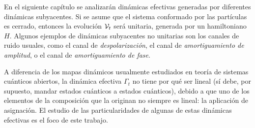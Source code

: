 En el siguiente capítulo se analizarán dinámicas efectivas generadas por diferentes dinámicas subyacentes. Si se asume que el sistema conformado por las partículas es cerrado, entonces la evolución $\mathcal{V}_{t}$ será unitaria, generada por un hamiltoniano $H$. Algunos ejemplos de dinámicas subyacentes no unitarias son los canales de ruido usuales, como el canal de \textit{despolarización}, el canal de \textit{amortiguamiento de amplitud}, o el canal de \textit{amortiguamiento de fase}. 



A diferencia de los mapas dinámicos usualmente estudiados en teoría de sistemas cuánticos abiertos, la dinámica efectiva $\Gamma_{t}$ no tiene por qué ser lineal (sí debe, por supuesto, mandar estados cuánticos a estados cuánticos), debido a que uno de los elementos de la composición que la originan no siempre es lineal: la aplicación de asignación. El estudio de las particularidades de algunas de estas dinámicas efectivas es el foco de este trabajo.


